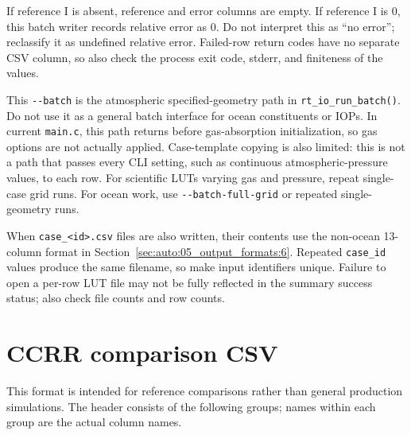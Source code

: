 If reference I is absent, reference and error columns are empty. If reference I is 0, this batch writer records relative error as 0. Do not interpret this as “no error”; reclassify it as undefined relative error. Failed-row return codes have no separate CSV column, so also check the process exit code, stderr, and finiteness of the values.

This \texttt{-\allowbreak{}-\allowbreak{}batch} is the atmospheric specified-geometry path in \texttt{rt\_\allowbreak{}io\_\allowbreak{}run\_\allowbreak{}batch()}. Do not use it as a general batch interface for ocean constituents or IOPs. In current \texttt{main.\allowbreak{}c}, this path returns before gas-absorption initialization, so gas options are not actually applied. Case-template copying is also limited: this is not a path that passes every CLI setting, such as continuous atmospheric-pressure values, to each row. For scientific LUTs varying gas and pressure, repeat single-case grid runs. For ocean work, use \texttt{-\allowbreak{}-\allowbreak{}batch-\allowbreak{}full-\allowbreak{}grid} or repeated single-geometry runs.

When \texttt{case\_\allowbreak{}<id>.\allowbreak{}csv} files are also written, their contents use the non-ocean 13-column format in Section~\ref{sec:auto:05_output_formats:6}. Repeated \texttt{case\_\allowbreak{}id} values produce the same filename, so make input identifiers unique. Failure to open a per-row LUT file may not be fully reflected in the summary success status; also check file counts and row counts.

\section{CCRR comparison CSV}
\label{sec:auto:05_output_formats:9}
This format is intended for reference comparisons rather than general production simulations. The header consists of the following groups; names within each group are the actual column names.


